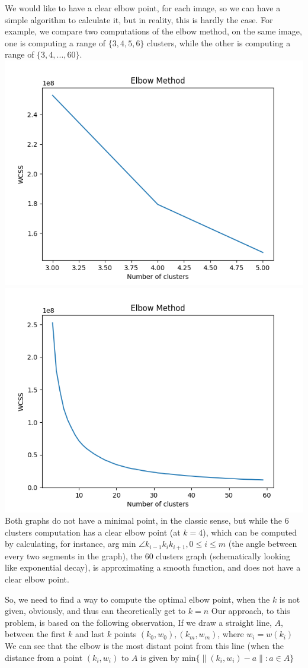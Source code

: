 \documentclass[12pt]{article}
\begin{document}
We would like to have a clear elbow point, for each image, so we can have a simple algorithm to calculate it, \newline
but in reality, this is hardly the case. For example, we compare two computations of the elbow method, on the same image, \newline
one is computing a range of $\{3,4,5,6\}$ clusters, while the other is computing a range of $\{3,4,...,60\}$. \newline
\includegraphics[width=0.50\columnwidth]{Figure_6.png}
\includegraphics[width=0.50\columnwidth]{Figure_60.png} \newline
Both graphs do not have a minimal point, in the classic sense,
but while the 6 clusters computation has a clear elbow point (at $k=4$), \newline
which can be computed by calculating, for instance, \newline
arg min $\angle k_{i-1}k_{i}k_{i+1},0 \leq i \leq m$ (the angle between every two segments in the graph),
the 60 clusters graph (schematically looking like exponential decay), \newline
is approximating a smooth function, and does not have a clear elbow point. \newline

So, we need to find a way to compute the optimal elbow point, when the $k$ is not given, obviously, and thus can theoretically get to $k=n$\newline
Our approach, to this problem, is based on the following observation, \newline
If we draw a straight line, $A$, between the first $k$ and last $k$ points $(k_0,w_0),(k_m,w_m)$, 
where $w_i=w(k_i)$ \newline
We can see that the elbow is the most distant point from this line (when the distance from a point $(k_i,w_i)$ to $A$ is given by 
min$\{\lVert(k_i,w_i)-a\rVert : a \in A\}$  \newline
\end{document}
